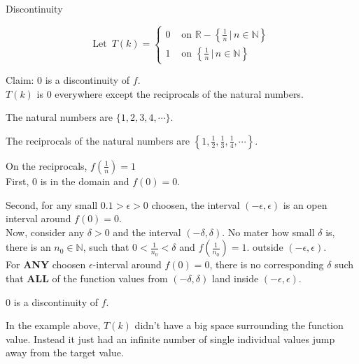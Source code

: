 \documentclass{ximera}
\begin{document}
\begin{example}  Discontinuity


\[
\text{Let } \, T(k) = 
\begin{cases}
  0 & \text{ on } \mathbb{R} - \left\{ \frac{1}{n} \, | \, n \in \mathbb{N}     \right\} \\
  1  & \text{ on } \left\{ \frac{1}{n} \, | \, n \in \mathbb{N}     \right\}
\end{cases}
\]



Claim: $0$ is a discontinuity of $f$. \\





$T(k)$ is $0$ everywhere except the reciprocals of the natural numbers.

The natural numbers are $\{ 1, 2, 3, 4, \cdots \}$.

The reciprocals of the natural numbers are $\left\{ 1, \frac{1}{2}, \frac{1}{3}, \frac{1}{4}, \cdots \right\}$.

On the reciprocals, $f\left(\frac{1}{n}\right) = 1$ \\



First, $0$ is in the domain and $f(0) = 0$.

Second, for any small $0.1 > \epsilon > 0$ choosen, the interval $(-\epsilon, \epsilon)$ is an open interval around $f(0) = 0$. \\



Now, consider any $\delta > 0$ and the interval $(-\delta, \delta)$. No mater how small $\delta$ is, there is an $n_0 \in \mathbb{N}$, such that $0 < \frac{1}{n_0} < \delta$ and $f\left(\frac{1}{n_0}\right) = 1$. outside $(-\epsilon, \epsilon)$. \\




For \textbf{\textcolor{red!50!blue!90!black}{ANY}} choosen $\epsilon$-interval around $f(0)= 0$, there is no corresponding $\delta$ such that \textbf{\textcolor{red!50!blue!90!black}{ALL}} of the function values from  $(-\delta, \delta)$ land inside $(-\epsilon, \epsilon)$.


$0$ is a discontinuity of $f$.


\end{example}






In the example above, $T(k)$ didn't have a big space surrounding the function value.  Instead it just had an infinite number of single individual values jump away from the target value.
\end{document}
